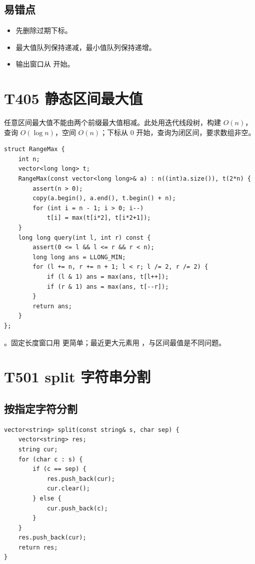 \subsection{易错点}

\begin{itemize}
  \item 先删除过期下标。
  \item 最大值队列保持递减，最小值队列保持递增。
  \item 输出窗口从  开始。
\end{itemize}

\section{T405 静态区间最大值}\label{sec:09-31}\label{tpl:405}
任意区间最大值不能由两个前缀最大值相减。此处用迭代线段树，构建 $O(n)$，查询 $O(\log n)$，空间 $O(n)$；下标从 0 开始，查询为闭区间，要求数组非空。
\begin{lstlisting}
struct RangeMax {
    int n;
    vector<long long> t;
    RangeMax(const vector<long long>& a) : n((int)a.size()), t(2*n) {
        assert(n > 0);
        copy(a.begin(), a.end(), t.begin() + n);
        for (int i = n - 1; i > 0; i--)
            t[i] = max(t[i*2], t[i*2+1]);
    }
    long long query(int l, int r) const {
        assert(0 <= l && l <= r && r < n);
        long long ans = LLONG_MIN;
        for (l += n, r += n + 1; l < r; l /= 2, r /= 2) {
            if (l & 1) ans = max(ans, t[l++]);
            if (r & 1) ans = max(ans, t[--r]);
        }
        return ans;
    }
};
\end{lstlisting}
。固定长度窗口用  更简单；最近更大元素用 ，与区间最值是不同问题。

\section{T501 split 字符串分割}\label{sec:09-32}\label{tpl:501}

\subsection{按指定字符分割}

\begin{lstlisting}
vector<string> split(const string& s, char sep) {
    vector<string> res;
    string cur;
    for (char c : s) {
        if (c == sep) {
            res.push_back(cur);
            cur.clear();
        } else {
            cur.push_back(c);
        }
    }
    res.push_back(cur);
    return res;
}
\end{lstlisting}


